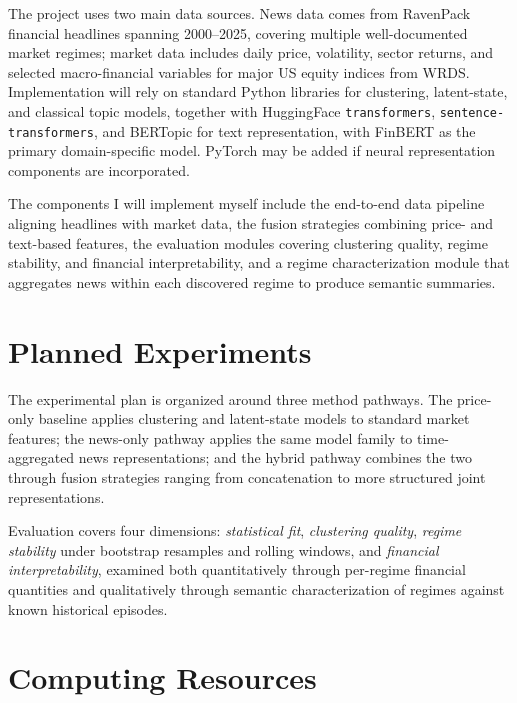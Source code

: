 \documentclass[12pt, letterpaper]{article}
\begin{document}
The project uses two main data sources. News data comes from RavenPack financial headlines spanning 2000--2025, covering multiple well-documented market regimes; market data includes daily price, volatility, sector returns, and selected macro-financial variables for major US equity indices from WRDS. Implementation will rely on standard Python libraries for clustering, latent-state, and classical topic models, together with HuggingFace \texttt{transformers}, \texttt{sentence-transformers}, and BERTopic for text representation, with FinBERT as the primary domain-specific model. PyTorch may be added if neural representation components are incorporated.

The components I will implement myself include the end-to-end data pipeline aligning headlines with market data, the fusion strategies combining price- and text-based features, the evaluation modules covering clustering quality, regime stability, and financial interpretability, and a regime characterization module that aggregates news within each discovered regime to produce semantic summaries. 


\section{Planned Experiments}

The experimental plan is organized around three method pathways. The price-only baseline applies clustering and latent-state models to standard market features; the news-only pathway applies the same model family to time-aggregated news representations; and the hybrid pathway combines the two through fusion strategies ranging from concatenation to more structured joint representations. 

 Evaluation covers four dimensions: \textit{statistical fit}, \textit{clustering quality}, \textit{regime stability} under bootstrap resamples and rolling windows, and \textit{financial interpretability}, examined both quantitatively through per-regime financial quantities and qualitatively through semantic characterization of regimes against known historical episodes. 

\section{Computing Resources}
\end{document}

